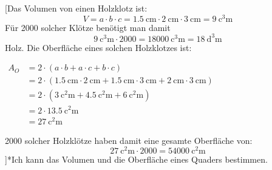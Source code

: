 \documentclass[
paper=a4,
fontsize=12pt,
headings=small,
parskip=half,
draft=false
]{scrartcl}
\begin{document}

[Das Volumen von einen Holzklotz ist: \[ V = a \cdot b \cdot c = \SI{1,5}{\centi\meter} \cdot \SI{2}{\centi\meter} \cdot \SI{3}{\centi\meter} = \SI{9}{\cubic\centi\meter}\] Für 2000 solcher Klötze benötigt man damit \[ \SI{9}{\cubic\centi\meter} \cdot 2000 = \SI{18000}{\cubic\centi\meter} = \SI{18}{\cubic\deci\meter}\] Holz. Die Oberfläche eines solchen Holzklotzes ist:	\begin{minipage}{\tabucolX}
		\centering
		$\begin{aligned}
		 A_O &= 2 \cdot (a\cdot b + a\cdot c + b\cdot c) \\
		&= 2 \cdot (\SI{1,5}{\centi\meter} \cdot \SI{2}{\centi\meter} + \SI{1,5}{\centi\meter} \cdot \SI{3}{\centi\meter} + \SI{2}{\centi\meter} \cdot \SI{3}{\centi\meter}) \\
		&= 2 \cdot (\SI{3}{\square\centi\meter} + \SI{4,5}{\square\centi\meter} + \SI{6}{\square\centi\meter}) \\
		&= 2 \cdot \SI{13,5}{\square\centi\meter} \\
		&= \SI{27}{\square\centi\meter}
		\end{aligned}$
	\end{minipage}
	2000 solcher Holzklötze haben damit eine gesamte Oberfläche von: \[ \SI{27}{\square\centi\meter} \cdot 2000 = \SI{54000}{\square\centi\meter} \]]*{Ich kann das Volumen und die Oberfläche eines Quaders bestimmen.}{}
\end{document}
